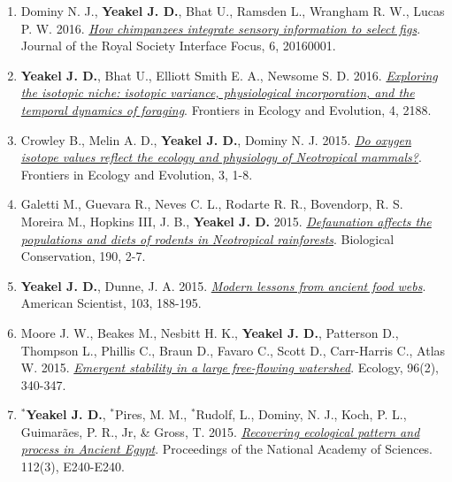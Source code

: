 \documentclass[margin,line,12pt]{res}
\begin{document}
\begin{resume}
\begin{enumerate}
\item Dominy N. J., \textbf{Yeakel J. D.}, Bhat U., Ramsden L., Wrangham R. W., Lucas P. W. 2016. \href{https://royalsocietypublishing.org/doi/full/10.1098/rsfs.2016.0001}{\emph{How chimpanzees integrate sensory information to select figs}}. Journal of the Royal Society Interface Focus, 6, 20160001.

\item \textbf{Yeakel J. D.}, Bhat U., Elliott Smith E. A., Newsome S. D. 2016. \href{https://www.frontiersin.org/articles/10.3389/fevo.2016.00001/full}{\emph{Exploring the isotopic niche: isotopic variance, physiological incorporation, and the temporal dynamics of foraging}}. Frontiers in Ecology and Evolution, 4, 2188.

\item Crowley B., Melin A. D., \textbf{Yeakel J. D.}, Dominy N. J. 2015. \href{https://www.frontiersin.org/articles/10.3389/fevo.2015.00127/full}{\emph{Do oxygen isotope values reflect the ecology and physiology of Neotropical mammals?}}. Frontiers in Ecology and Evolution, 3, 1-8.

\item Galetti M., Guevara R., Neves C. L., Rodarte R. R., Bovendorp, R. S. Moreira M., Hopkins III, J. B., \textbf{Yeakel J. D.} 2015. \href{https://www.sciencedirect.com/science/article/abs/pii/S000632071500186X}{\emph{Defaunation affects the populations and diets of rodents in Neotropical rainforests}}. Biological Conservation, 190, 2-7.

\item \textbf{Yeakel J. D.}, Dunne, J. A. 2015. \href{https://www.americanscientist.org/article/modern-lessons-from-ancient-food-webs}{\emph{Modern lessons from ancient food webs}}. American Scientist, 103, 188-195.

\item Moore J. W., Beakes M., Nesbitt H. K., \textbf{Yeakel J. D.}, Patterson D., Thompson L., Phillis C., Braun D., Favaro C., Scott D., Carr-Harris C., Atlas W. 2015. \href{https://esajournals.onlinelibrary.wiley.com/doi/full/10.1890/14-0326.1}{\emph{Emergent stability in a large free-flowing watershed}}. Ecology, 96(2), 340-347.

\item \textbf{${}^\ast$Yeakel J. D.}, ${}^\ast$Pires, M. M., ${}^\ast$Rudolf, L., Dominy, N. J., Koch, P. L., Guimar\~aes, P. R., Jr,
\& Gross, T. 2015. \href{https://www.pnas.org/content/early/2015/01/07/1422646112}{\emph{Recovering ecological pattern and process in Ancient Egypt}}. Proceedings of the National Academy of Sciences. 112(3), E240-E240.


\end{enumerate}
\end{resume}
\end{document}
